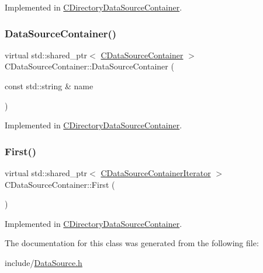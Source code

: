 Implemented in \hyperlink{classCDirectoryDataSourceContainer_ac925eec9c2c71654d0012bff92a462d4}{C\+Directory\+Data\+Source\+Container}.

\hypertarget{classCDataSourceContainer_abebf1b9a6168b6783ee9753df612e511}{}\label{classCDataSourceContainer_abebf1b9a6168b6783ee9753df612e511} 
\subsubsection{\texorpdfstring{Data\+Source\+Container()}{DataSourceContainer()}}
{\footnotesize\ttfamily virtual std\+::shared\+\_\+ptr$<$ \hyperlink{classCDataSourceContainer}{C\+Data\+Source\+Container} $>$ C\+Data\+Source\+Container\+::\+Data\+Source\+Container (\begin{DoxyParamCaption}\item[{const std\+::string \&}]{name }\end{DoxyParamCaption})\hspace{0.3cm}{\ttfamily [pure virtual]}}



Implemented in \hyperlink{classCDirectoryDataSourceContainer_a71291ab0a549056fc784f0c553a8dc39}{C\+Directory\+Data\+Source\+Container}.

\hypertarget{classCDataSourceContainer_ad50184dd4ec1c79c776fe0d7d9910925}{}\label{classCDataSourceContainer_ad50184dd4ec1c79c776fe0d7d9910925} 
\subsubsection{\texorpdfstring{First()}{First()}}
{\footnotesize\ttfamily virtual std\+::shared\+\_\+ptr$<$ \hyperlink{classCDataSourceContainerIterator}{C\+Data\+Source\+Container\+Iterator} $>$ C\+Data\+Source\+Container\+::\+First (\begin{DoxyParamCaption}{ }\end{DoxyParamCaption})\hspace{0.3cm}{\ttfamily [pure virtual]}}



Implemented in \hyperlink{classCDirectoryDataSourceContainer_a32aa8888dbf78f5a2a1ddb5324aad0cf}{C\+Directory\+Data\+Source\+Container}.



The documentation for this class was generated from the following file\+:\begin{DoxyCompactItemize}
\item 
include/\hyperlink{DataSource_8h}{Data\+Source.\+h}\end{DoxyCompactItemize}
